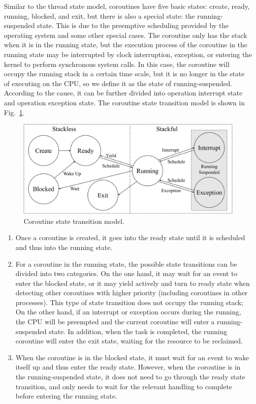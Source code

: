 \documentclass[sigconf,review,anonymous]{acmart}
\begin{document}
Similar to the thread state model, coroutines have five basic states: create, ready, running, blocked, and exit, but there is also a special state: the running-suspended state. This is due to the preemptive scheduling provided by the operating system and some other special cases. The coroutine only has the stack when it is in the running state, but the execution process of the coroutine in the running state may be interrupted by clock interruption, exception, or entering the kernel to perform synchronous system calls. In this case, the coroutine will occupy the running stack in a certain time scale, but it is no longer in the state of executing on the CPU, so we define it as the state of running-suspended. According to the cause, it can be further divided into operation interrupt state and operation exception state. The coroutine state transition model is shown in Fig.~\ref{fig:state}.

\begin{figure}[h]
  \centering
  \includegraphics[width=\linewidth]{assets/cstate.pdf}
  \caption{Coroutine state transition model.}
  \label{fig:state}
\end{figure}

\begin{enumerate}[leftmargin=*]
    \item Once a coroutine is created, it goes into the ready state until it is scheduled and thus into the running state.
    \item For a coroutine in the running state, the possible state transitions can be divided into two categories. On the one hand, it may wait for an event to enter the blocked state, or it may yield actively and turn to ready state when detecting other coroutines with higher priority (including coroutines in other processes). This type of state transition does not occupy the running stack; On the other hand, if an interrupt or exception occurs during the running, the CPU will be preempted and the current coroutine will enter a running-suspended state. In addition, when the task is completed, the running coroutine will enter the exit state, waiting for the resource to be reclaimed.
    \item When the coroutine is in the blocked state, it must wait for an event to wake itself up and thus enter the ready state. However, when the coroutine is in the running-suspended state, it does not need to go through the ready state transition, and only needs to wait for the relevant handling to complete before entering the running state.
\end{enumerate}
\end{document}
